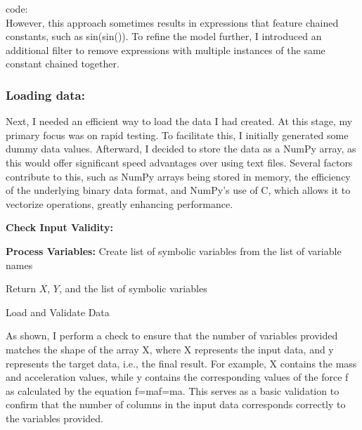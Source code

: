 \documentclass{article}
\begin{document}
code: \\

However, this approach sometimes results in expressions that feature chained constants, such as sin(sin()). To refine the model further, I introduced an additional filter to remove expressions with multiple instances of the same constant chained together.\\


\subsubsection{Loading data:}

Next, I needed an efficient way to load the data I had created. At this stage, my primary focus was on rapid testing. To facilitate this, I initially generated some dummy data values. Afterward, I decided to store the data as a NumPy array, as this would offer significant speed advantages over using text files. Several factors contribute to this, such as NumPy arrays being stored in memory, the efficiency of the underlying binary data format, and NumPy's use of C, which allows it to vectorize operations, greatly enhancing performance.\\



\begin{algorithm}[H]
\SetAlgoLined
{}

\textbf{Check Input Validity:}\;

\textbf{Process Variables:}\;
Create list of symbolic variables from the list of variable names\;

Return \(X\), \(Y\), and the list of symbolic variables\;

\caption{Load and Validate Data}
\label{alg:load_data} %
\end{algorithm}




As shown, I perform a check to ensure that the number of variables provided matches the shape of the array X, where X represents the input data, and y represents the target data, i.e., the final result. For example, X contains the mass and acceleration values, while y contains the corresponding values of the force f as calculated by the equation f=maf=ma. This serves as a basic validation to confirm that the number of columns in the input data corresponds correctly to the variables provided.\\
\end{document}
